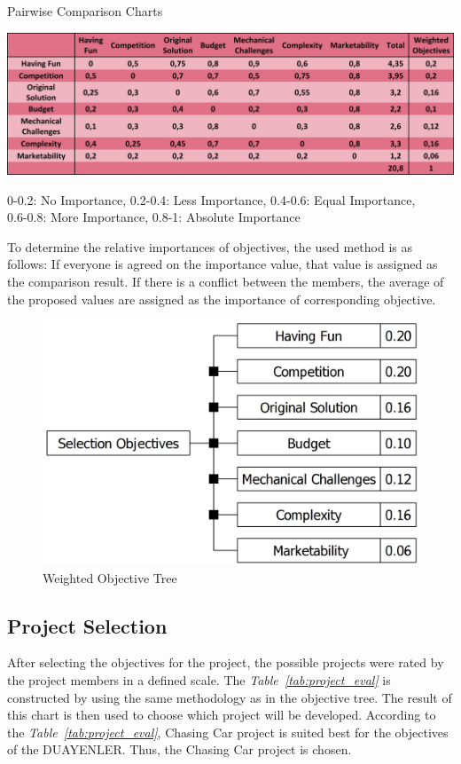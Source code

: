 \documentclass[a4paper,12pt]{article}
\begin{document}
	\begin{table}[H]
		\centering
		\caption{\label{tab:pairwise_comp}Pairwise Comparison Charts}\vspace{-.2cm}
		\includegraphics[width=\textwidth]{images/objective_tree3} 
	\vspace*{-.9cm}	\begin{center}
		{\small 0-0.2: No Importance, 0.2-0.4: Less Importance, 0.4-0.6: Equal Importance,\\ 0.6-0.8: More Importance, 0.8-1: Absolute Importance }	
		\end{center}
	\end{table}	\vspace*{-.5cm}	
	To determine the relative importances of objectives, the used method is as follows: If everyone is agreed on the importance value, that value is assigned as the comparison result. If there is a conflict between the members, the average of the proposed values are assigned as the importance of corresponding objective.
	\begin{figure}[H]
		\centering
		\includegraphics[width=.6\textwidth]{pre-objective-tree/pre-objective-tree} 
		\caption{\label{fig:objective_tree}Weighted Objective Tree}
	\end{figure}
	
	
	\subsection{Project Selection}	
	
		After selecting the objectives for the project, the possible projects were rated by the project members in a defined scale. The \textit{Table~\ref{tab:project_eval}} is constructed by using the same methodology as in the objective tree. The result of this chart is then used to choose which project will be developed. According to the \textit{Table~\ref{tab:project_eval}}, Chasing Car project is suited best for the objectives of the DUAYENLER. Thus, the Chasing Car project is chosen.
		
\end{document}
